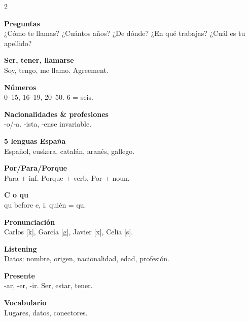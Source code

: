 \documentclass[8pt,landscape,a4paper]{article}
\begin{document}
\newpage
\vspace*{0.3em}
\noindent\color{notegrey}
\setlength{\parskip}{0.3em}
\begin{multicols}{2}

\textbf{Preguntas}\\
¿C\'omo te llamas? ¿Cu\'antos a\~nos? ¿De d\'onde? ¿En qu\'e trabajas? ¿Cu\'al es tu apellido?

\textbf{Ser, tener, llamarse}\\
Soy, tengo, me llamo. Agreement.

\textbf{N\'umeros}\\
0--15, 16--19, 20--50. 6 = seis.

\textbf{Nacionalidades \& profesiones}\\
-o/-a. -ista, -ense invariable.

\textbf{5 lenguas Espa\~na}\\
Espa\~nol, euskera, catal\'an, aran\'es, gallego.

\textbf{Por/Para/Porque}\\
Para + inf. Porque + verb. Por + noun.

\textbf{C o qu}\\
qu before e, i. qui\'en = qu.

\textbf{Pronunciaci\'on}\\
Carlos [k], Garc\'ia [g], Javier [x], Celia [s].

\textbf{Listening}\\
Datos: nombre, origen, nacionalidad, edad, profesi\'on.

\textbf{Presente}\\
-ar, -er, -ir. Ser, estar, tener.

\textbf{Vocabulario}\\
Lugares, datos, conectores.

\end{multicols}
\vfill
\normalsize\normalfont\color{black}
\end{document}
